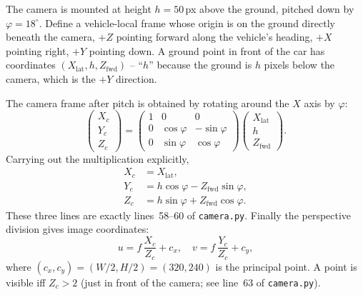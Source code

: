 The camera is mounted at height $h=50$\,px above the ground, pitched
down by $\varphi=18^\circ$. Define a vehicle-local frame whose origin
is on the ground directly beneath the camera, $+Z$ pointing forward
along the vehicle's heading, $+X$ pointing right, $+Y$ pointing down.
A ground point in front of the car has coordinates
$(X_{\text{lat}}, h, Z_{\text{fwd}})$ -- ``$h$'' because the ground is
$h$ pixels below the camera, which is the $+Y$ direction.

The camera frame after pitch is obtained by rotating around the $X$
axis by $\varphi$:
\begin{equation}
\begin{pmatrix}X_c\\Y_c\\Z_c\end{pmatrix} =
\begin{pmatrix}1 & 0 & 0\\ 0 & \cos\varphi & -\sin\varphi\\ 0 & \sin\varphi & \cos\varphi\end{pmatrix}
\begin{pmatrix}X_{\text{lat}}\\ h\\ Z_{\text{fwd}}\end{pmatrix}.
\label{eq:rot}
\end{equation}
Carrying out the multiplication explicitly,
\begin{equation}
\begin{aligned}
X_c &= X_{\text{lat}},\\
Y_c &= h\cos\varphi - Z_{\text{fwd}}\sin\varphi,\\
Z_c &= h\sin\varphi + Z_{\text{fwd}}\cos\varphi.
\end{aligned}
\label{eq:cam}
\end{equation}
These three lines are exactly lines~58--60 of \texttt{camera.py}.
Finally the perspective division gives image coordinates:
\begin{equation}
u = f\,\frac{X_c}{Z_c} + c_x,\quad
v = f\,\frac{Y_c}{Z_c} + c_y,
\label{eq:proj}
\end{equation}
where $(c_x,c_y)=(W/2,H/2)=(320,240)$ is the principal point. A point
is visible iff $Z_c>2$ (just in front of the camera; see line~63 of
\texttt{camera.py}).


